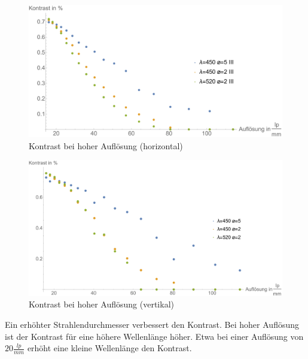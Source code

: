 \begin{minipage}{\linewidth}
\begin{figure}[H]
	\centering
\includegraphics[width=1.0\linewidth]{IMAGE/Versuch2Plot2horizontal2.pdf}
	\caption{Kontrast bei hoher Auflösung (horizontal)}
	\label{fig:Versuch2_Plot2h2}
\end{figure} 

\begin{figure}[H]
	\centering
\includegraphics[width=1.0\linewidth]{IMAGE/Versuch2Plot2vertikal2.pdf}
	\caption{Kontrast bei hoher Auflösung (vertikal)}
	\label{fig:Versuch2_Plot2v2}
\end{figure} 

Ein erhöhter Strahlendurchmesser verbessert den Kontrast. Bei hoher Auflösung ist der Kontrast für eine höhere Wellenlänge höher. Etwa bei einer Auflösung von $20 \frac{lp}{mm}$ erhöht eine kleine Wellenlänge den Kontrast.
\end{minipage}



